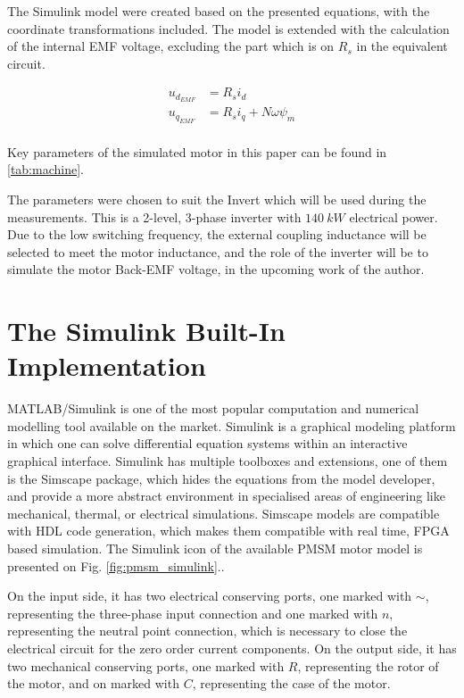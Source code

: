 \documentclass[twoside,b5paper,10pt]{article}
\begin{document}
The Simulink model were created based on the presented equations, with the coordinate transformations included. The model is extended with the calculation of the internal EMF voltage, excluding the part which is on $R_s$ in the equivalent circuit.

\begin{equation}
\begin{aligned}
\label{eq:custom_motor_elec}
    u_d_{EMF} &= R_si_d  \\
    u_q_{EMF} &= R_si_q + N\omega{}\psi_m \\
\end{aligned}
\end{equation}

Key parameters of the simulated motor in this paper can be found in \ref{tab:machine}.



The parameters were chosen to suit the Invert which will be used during the measurements. This is a 2-level, 3-phase inverter with $140\ kW$ electrical power. Due to the low switching frequency, the external coupling inductance will be selected to meet the motor inductance, and the role of the inverter will be to simulate the motor Back-EMF voltage, in the upcoming work of the author.

\section{The Simulink Built-In Implementation}
\label{sec:simulink_model}

MATLAB/Simulink is one of the most popular computation and numerical modelling tool available on the market. Simulink is a graphical modeling platform in which one can solve differential equation systems within an interactive graphical interface. Simulink has multiple toolboxes and extensions, one of them is the Simscape package, which hides the equations from the model developer, and provide a more abstract environment in specialised areas of engineering like mechanical, thermal, or electrical simulations. Simscape models are compatible with HDL code generation, which makes them compatible with real time, FPGA based simulation. The Simulink icon of the available PMSM motor model is presented on Fig. \ref{fig:pmsm_simulink}..



On the input side, it has two electrical conserving ports, one marked with $\sim$, representing the three-phase input connection and one marked with $n$, representing the neutral point connection, which is necessary to close the electrical circuit for the zero order current components. On the output side, it has two mechanical conserving ports, one marked with $R$, representing the rotor of the motor, and on marked with $C$, representing the case of the motor.\cite{matlab}
\end{document}
